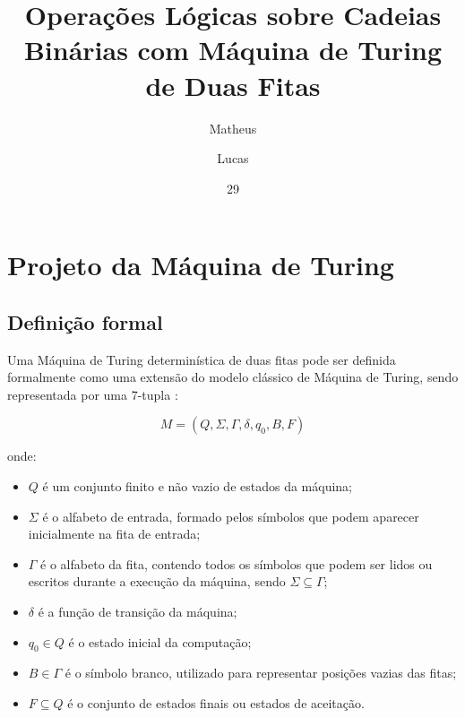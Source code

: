 \documentclass[report, 12pt]{uftreport}
\title{Operações Lógicas sobre Cadeias Binárias com Máquina de Turing de Duas Fitas}
\author{Matheus}{Silva Pontes}
\author{Lucas}{Monteiro de Carvalho}
\date{29}{9}{2026}   %
\makeatletter
\renewcommand\makefrontpage{%
  \begin{center}
    \nohyphens{\bfseries\local@title}\par
  \end{center}
  \vfill
  \begin{flushright}
    \begin{minipage}{8.5cm}
      \setstretch{1}
      \frontpage@maintext
    \end{minipage}\par
  \end{flushright}
  \vfill
  \frontpage@bottomtext
}
\makeatother
\begin{document}
\frontmatter

\maketitle

\makefrontpage
\newpage

\tableofcontents

\mainmatter


\chapter{Projeto da Máquina de Turing}
\label{cap:projeto}


\section{Definição formal}

Uma Máquina de Turing determinística de duas fitas pode ser definida
formalmente como uma extensão do modelo clássico de Máquina de Turing,
sendo representada por uma 7-tupla \cite{sipser}:

\[
M=(Q,\Sigma,\Gamma,\delta,q_0,B,F)
\]

onde:

\begin{itemize}
    \item $Q$ é um conjunto finito e não vazio de estados da máquina;
    \item $\Sigma$ é o alfabeto de entrada, formado pelos símbolos que podem
    aparecer inicialmente na fita de entrada;
    \item $\Gamma$ é o alfabeto da fita, contendo todos os símbolos que podem
    ser lidos ou escritos durante a execução da máquina, sendo
    $\Sigma \subseteq \Gamma$;
    \item $\delta$ é a função de transição da máquina;
    \item $q_0 \in Q$ é o estado inicial da computação;
    \item $B \in \Gamma$ é o símbolo branco, utilizado para representar
    posições vazias das fitas;
    \item $F \subseteq Q$ é o conjunto de estados finais ou estados de
    aceitação.
\end{itemize}
\end{document}
